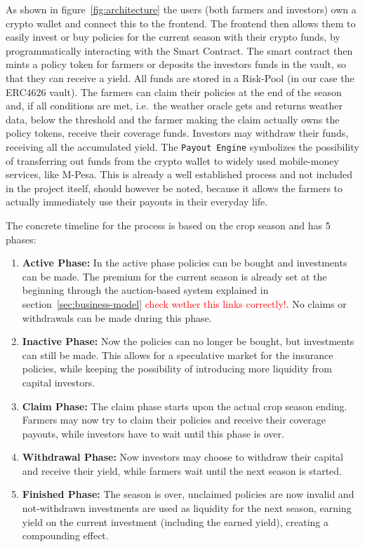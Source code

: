 \documentclass[11pt,a4paper]{article}
\begin{document}
	As shown in figure~\ref{fig:architecture} the users (both farmers and investors) own a crypto wallet and connect this to the frontend.
	The frontend then allows them to easily invest or buy policies for the current season with their crypto funds, by programmatically interacting with the Smart Contract.
	The smart contract then mints a policy token for farmers or deposits the investors funds in the vault, so that they can receive a yield.
	All funds are stored in a Risk-Pool (in our case the ERC4626 vault).
	The farmers can claim their policies at the end of the season and, if all conditions are met, i.e.\ the weather oracle gets and returns weather data, below the threshold and the farmer making the claim actually owns the policy tokens, receive their coverage funds.
	Investors may withdraw their funds, receiving all the accumulated yield.
	The \texttt{Payout Engine} symbolizes the possibility of transferring out funds from the crypto wallet to widely used mobile-money services, like M-Pesa.
	This is already a well established process and not included in the project itself, should however be noted, because it allows the farmers to actually immediately use their payouts in their everyday life.

	The concrete timeline for the process is based on the crop season and has 5 phases:
	\begin{enumerate}
		\item \textbf{Active Phase:} In the active phase policies can be bought and investments can be made.
			The premium for the current season is already set at the beginning through the auction-based system explained in section~\ref{sec:business-model} \textcolor{red}{check wether this links correctly!}.
			No claims or withdrawals can be made during this phase.
		\item \textbf{Inactive Phase:} Now the policies can no longer be bought, but investments can still be made.
			This allows for a speculative market for the insurance policies, while keeping the possibility of introducing more liquidity from capital investors.
		\item \textbf{Claim Phase:} The claim phase starts upon the actual crop season ending.
			Farmers may now try to claim their policies and receive their coverage payouts, while investors have to wait until this phase is over.
		\item \textbf{Withdrawal Phase:} Now investors may choose to withdraw their capital and receive their yield, while farmers wait until the next season is started.
		\item \textbf{Finished Phase:} The season is over, unclaimed policies are now invalid and not-withdrawn investments are used as liquidity for the next season, earning yield on the current investment (including the earned yield), creating a compounding effect.
	\end{enumerate}
\end{document}
